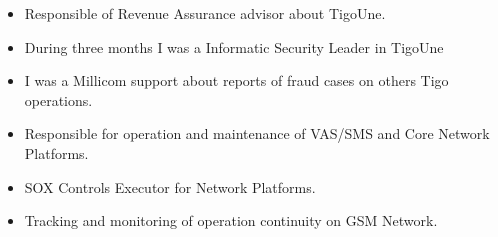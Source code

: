 \documentclass[10pt,letter]{altacv}
\begin{document}
\divider



\begin{itemize}
\item Responsible of Revenue Assurance advisor about TigoUne.
\item During three months I was a Informatic Security Leader in TigoUne
\item I was a Millicom support about reports of fraud cases on others Tigo operations. 
\end{itemize}

\divider

\clearpage
{}

\begin{itemize}
\item Responsible for operation and maintenance of VAS/SMS and Core Network Platforms. 
\item SOX Controls Executor for Network Platforms.
\end{itemize}
\divider
\divider
 	
\begin{itemize}
\item Tracking and monitoring of operation continuity on GSM Network.
\end{itemize}
\end{document}
